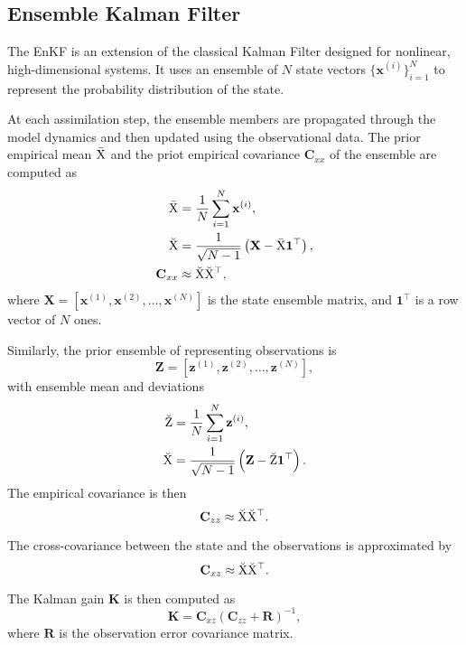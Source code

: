 \documentclass{article}
\begin{document}
\subsection{Ensemble Kalman Filter}

The EnKF is an extension of the classical Kalman Filter designed for nonlinear, high-dimensional systems. It uses an ensemble of $N$ state vectors $\{\mathbf{x}^{(i)}\}_{i=1}^N$ to represent the probability distribution of the state.

At each assimilation step, the ensemble members are propagated through the model dynamics and then updated using the observational data. The prior empirical mean $\bar{\mathrm{X}}$ and the priot empirical covariance $\mathbf{C}_{xx}$ of the ensemble are computed as
\begin{align}
    \bar{\mathrm{X}} &= \frac{1}{N} \sum_{i=1}^N \mathbf{x}^{(i)}, \label{eq:ensemble_mean} \\
    \breve{\mathrm{X}} &= \frac{1}{\sqrt{N-1}} \left( \mathbf{X} - \bar{\mathrm{X}} \mathbf{1}^\top \right), \label{eq:deviation_matrix} \\
    \mathbf{C}_{xx} &\approx \breve{\mathrm{X}} \breve{\mathrm{X}}^\top, \label{eq:ensemble_covariance}
\end{align}
where $\mathbf{X} = [\mathbf{x}^{(1)}, \mathbf{x}^{(2)}, \dots, \mathbf{x}^{(N)}]$ is the state ensemble matrix, and $\mathbf{1}^\top$ is a row vector of $N$ ones.

Similarly, the prior ensemble of representing observations is
\begin{equation}
    \mathbf{Z} = [\mathbf{z}^{(1)}, \mathbf{z}^{(2)}, \dots, \mathbf{z}^{(N)}],
\end{equation}
with ensemble mean and deviations
\begin{align}
    \breve{\mathrm{Z}} &= \frac{1}{N} \sum_{i=1}^N \mathbf{z}^{(i)}, \\
    \breve{\mathrm{X}} &= \frac{1}{\sqrt{N-1}} \left( \mathbf{Z} - \breve{\mathrm{Z}} \mathbf{1}^\top \right).
\end{align}
The empirical covariance is then
\begin{equation}
    \mathbf{C}_{zz} \approx \breve{\mathrm{X}} \breve{\mathrm{X}}^\top.
\end{equation}

The cross-covariance between the state and the observations is approximated by
\begin{equation}
    \mathbf{C}_{xz} \approx \breve{\mathrm{X}} \breve{\mathrm{X}}^\top.
\end{equation}

The Kalman gain $\mathbf{K}$ is then computed as
\begin{equation}
    \mathbf{K} = \mathbf{C}_{xz} \left( \mathbf{C}_{zz} + \mathbf{R} \right)^{-1},
    \label{eq:kalman_gain}
\end{equation}
where $\mathbf{R}$ is the observation error covariance matrix.
\end{document}
